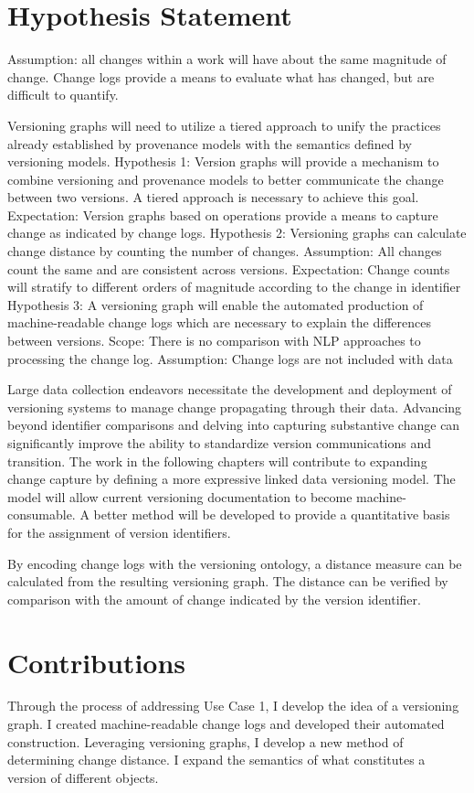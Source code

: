 \section{Hypothesis Statement}

Assumption: all changes within a work will have about the same magnitude of change.
Change logs provide a means to evaluate what has changed, but are difficult to quantify.

Versioning graphs will need to utilize a tiered approach to unify the practices already established by provenance models with the semantics defined by versioning models.
Hypothesis 1: Version graphs will provide a mechanism to combine versioning and provenance models to better communicate the change between two versions.  A tiered approach is necessary to achieve this goal.
	Expectation: Version graphs based on operations provide a means to capture change as indicated by change logs.
Hypothesis 2: Versioning graphs can calculate change distance by counting the number of changes.
	Assumption: All changes count the same and are consistent across versions.
	Expectation: Change counts will stratify to different orders of magnitude according to the change in identifier
Hypothesis 3: A versioning graph will enable the automated production of machine-readable change logs which are necessary to explain the differences between versions.
	Scope: There is no comparison with NLP approaches to processing the change log.
	Assumption: Change logs are not included with data

Large data collection endeavors necessitate the development and deployment of versioning systems to manage change propagating through their data.
Advancing beyond identifier comparisons and delving into capturing substantive change can significantly improve the ability to standardize version communications and transition.
The work in the following chapters will contribute to expanding change capture by defining a more expressive linked data versioning model.
The model will allow current versioning documentation to become machine-consumable.
A better method will be developed to provide a quantitative basis for the assignment of version identifiers.

By encoding change logs with the versioning ontology, a distance measure can be calculated from the resulting versioning graph.
The distance can be verified by comparison with the amount of change indicated by the version identifier.

\section{Contributions}

Through the process of addressing Use Case 1, I develop the idea of a versioning graph.
I created machine-readable change logs and  developed their automated construction.
Leveraging versioning graphs, I develop a new method of determining change distance.
I expand the semantics of what constitutes a version of different objects.

